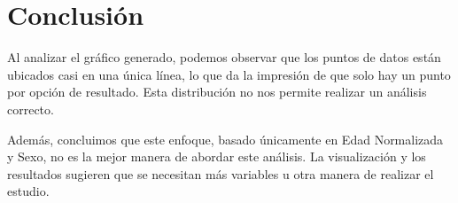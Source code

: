 \documentclass[a4paper, 10pt]{article}
\begin{document}
\section{Conclusión}\label{s:4}
Al analizar el gráfico generado, podemos observar que los puntos de datos están ubicados casi en una única línea, lo que da la impresión de que solo hay un punto por opción de resultado. Esta distribución no nos permite realizar un análisis correcto.

Además, concluimos que este enfoque, basado únicamente en Edad Normalizada y Sexo, no es la mejor manera de abordar este análisis. La visualización y los resultados sugieren que se necesitan más variables u otra manera de realizar el estudio.
\end{document}
